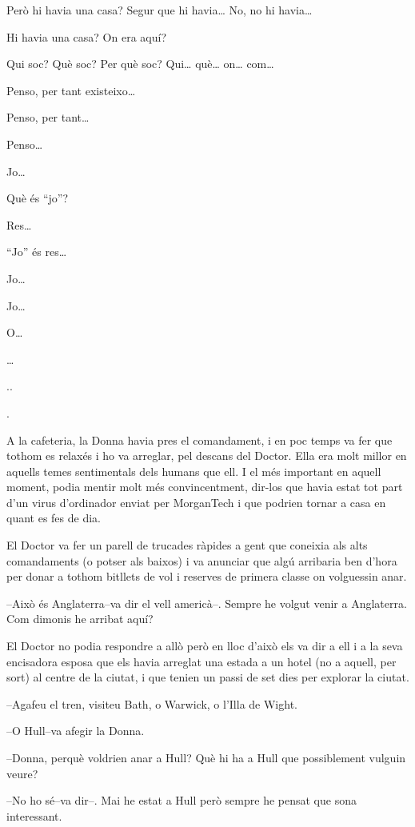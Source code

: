 Però hi havia una casa? Segur que hi havia\ldots{} No, no hi
havia\ldots{}

Hi havia una casa? On era aquí?

Qui soc? Què soc? Per què soc? Qui\ldots{} què\ldots{} on\ldots{}
com\ldots{}

Penso, per tant existeixo\ldots{}

Penso, per tant\ldots{}

Penso\ldots{}

Jo\ldots{}

Què és ``jo''?

Res\ldots{}

``Jo'' és res\ldots{}

Jo\ldots{}

Jo\ldots{}

O\ldots{}

\ldots{}

..

.

A la cafeteria, la Donna havia pres el comandament, i en poc temps va
fer que tothom es relaxés i ho va arreglar, pel descans del Doctor. Ella
era molt millor en aquells temes sentimentals dels humans que ell. I el
més important en aquell moment, podia mentir molt més convincentment,
dir-los que havia estat tot part d'un virus d'ordinador enviat per
MorganTech i que podrien tornar a casa en quant es fes de dia.

El Doctor va fer un parell de trucades ràpides a gent que coneixia als
alts comandaments (o potser als baixos) i va anunciar que algú arribaria
ben d'hora per donar a tothom bitllets de vol i reserves de primera
classe on volguessin anar.

--Això és Anglaterra--va dir el vell americà--. Sempre he volgut venir a
Anglaterra. Com dimonis he arribat aquí?

El Doctor no podia respondre a allò però en lloc d'això els va dir a ell
i a la seva encisadora esposa que els havia arreglat una estada a un
hotel (no a aquell, per sort) al centre de la ciutat, i que tenien un
passi de set dies per explorar la ciutat.

--Agafeu el tren, visiteu Bath, o Warwick, o l'Illa de Wight.

--O Hull--va afegir la Donna.

--Donna, perquè voldrien anar a Hull? Què hi ha a Hull que possiblement
vulguin veure?

--No ho sé--va dir--. Mai he estat a Hull però sempre he pensat que sona
interessant.

